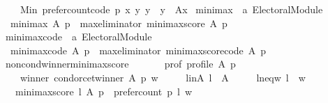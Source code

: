 \begin{isabellebody}
\ \ \ \ Min\ {\isacharbraceleft}{\kern0pt}prefer{\isacharunderscore}{\kern0pt}count{\isacharunderscore}{\kern0pt}code\ p\ x\ y\ {\isacharbar}{\kern0pt}y\ {\isachardot}{\kern0pt}\ y\ {\isasymin}\ A{\isacharminus}{\kern0pt}{\isacharbraceleft}{\kern0pt}x{\isacharbraceright}{\kern0pt}{\isacharbraceright}{\kern0pt}{\isachardoublequoteclose}\isanewline
\isanewline
{}\isamarkupfalse%
\ minimax\ {\isacharcolon}{\kern0pt}{\isacharcolon}{\kern0pt}\ {\isachardoublequoteopen}{\isacharprime}{\kern0pt}a\ Electoral{\isacharunderscore}{\kern0pt}Module{\isachardoublequoteclose}\ \isanewline
\ \ {\isachardoublequoteopen}minimax\ A\ p\ {\isacharequal}{\kern0pt}\ max{\isacharunderscore}{\kern0pt}eliminator\ minimax{\isacharunderscore}{\kern0pt}score\ A\ p{\isachardoublequoteclose}\isanewline
\isanewline
{}\isamarkupfalse%
\ minimax{\isacharunderscore}{\kern0pt}code\ {\isacharcolon}{\kern0pt}{\isacharcolon}{\kern0pt}\ {\isachardoublequoteopen}{\isacharprime}{\kern0pt}a\ Electoral{\isacharunderscore}{\kern0pt}Module{\isachardoublequoteclose}\ \isanewline
\ \ {\isachardoublequoteopen}minimax{\isacharunderscore}{\kern0pt}code\ A\ p\ {\isacharequal}{\kern0pt}\ max{\isacharunderscore}{\kern0pt}eliminator\ minimax{\isacharunderscore}{\kern0pt}score{\isacharunderscore}{\kern0pt}code\ A\ p{\isachardoublequoteclose}%
\isadelimdocument
%
\endisadelimdocument
%
\isatagdocument
%
\isamarkuptrue%
%
\endisatagdocument
{\isafolddocument}%
%
\isadelimdocument
%
\endisadelimdocument
{}\isamarkupfalse%
\ non{\isacharunderscore}{\kern0pt}cond{\isacharunderscore}{\kern0pt}winner{\isacharunderscore}{\kern0pt}minimax{\isacharunderscore}{\kern0pt}score{\isacharcolon}{\kern0pt}\isanewline
\ \ \isanewline
\ \ \ \ prof{\isacharcolon}{\kern0pt}\ {\isachardoublequoteopen}profile\ A\ p{\isachardoublequoteclose}\ \isanewline
\ \ \ \ winner{\isacharcolon}{\kern0pt}\ {\isachardoublequoteopen}condorcet{\isacharunderscore}{\kern0pt}winner\ A\ p\ w{\isachardoublequoteclose}\ \isanewline
\ \ \ \ l{\isacharunderscore}{\kern0pt}in{\isacharunderscore}{\kern0pt}A{\isacharcolon}{\kern0pt}\ {\isachardoublequoteopen}l\ {\isasymin}\ A{\isachardoublequoteclose}\ \isanewline
\ \ \ \ l{\isacharunderscore}{\kern0pt}neq{\isacharunderscore}{\kern0pt}w{\isacharcolon}{\kern0pt}\ {\isachardoublequoteopen}l\ {\isasymnoteq}\ w{\isachardoublequoteclose}\isanewline
\ \ \ {\isachardoublequoteopen}minimax{\isacharunderscore}{\kern0pt}score\ l\ A\ p\ {\isasymle}\ prefer{\isacharunderscore}{\kern0pt}count\ p\ l\ w{\isachardoublequoteclose}\isanewline

\end{isabellebody}
